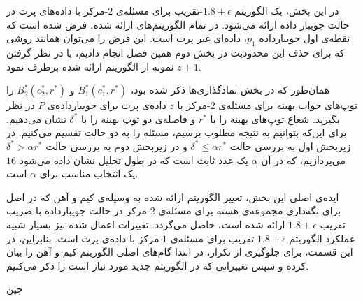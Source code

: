 
در این بخش، یک الگوریتم $1.8 + \epsilon$-تقریب برای مسئله‌ی $2$-مرکز با داده‌های پرت در حالت جویبار داده ارائه می‌شود. در تمام الگوریتم‌های ارائه شده، فرض شده است که نقطه‌ی اول جویبارداده $p_1$، داده‌ای غیر پرت است. این فرض را می‌توان همانند روشی که برای حذف این محدودیت در بخش دوم همین فصل انجام دادیم، با در نظر گرفتن $z+1$ نمونه از الگوریتم ارائه شده برطرف نمود.

همان‌طور که در بخش نماد‌گذاری‌ها ذکر شده بود، $B_1^*(c_1^*, r^*)$ و $B_2^*(c_2^*, r^*)$ را توپ‌های جواب بهینه برای مسئله‌ی $2$-مرکز با $z$ داده‌ی پرت برای جویبارداده‌ی $P$ در نظر بگیرید. شعاع توپ‌های بهینه را با $r^*$ و فاصله‌ی دو توپ بهینه را با $\delta^*$ نشان می‌دهیم. برای این‌که بتوانیم به نتیجه مطلوب برسیم، مسئله را به دو حالت تقسیم می‌کنیم. در زیربخش اول به بررسی حالت $\delta^* \leq \alpha r^*$ و در زیربخش دوم به بررسی حالت $\delta^* > \alpha r^*$ می‌پردازیم، که در آن $\alpha$ یک عدد ثابت است که در طول تحلیل نشان داده می‌شود $16$ یک انتخاب مناسب برای $\alpha$ است.



ایده‌ی اصلی این بخش، تغییر الگوریتم ارائه شده به وسیله‌ی کیم و آهن  که در اصل برای نگه‌داری مجموعه‌ی هسته برای مسئله‌ی $2$-مرکز در حالت جویبارداده با ضریب تقریب $1.8 + \epsilon$ ارائه شده است، حاصل می‌گردد. تغییرات اعمال شده نیز‌ بسیار شبیه عملکرد الگوریتم $1.8 + \epsilon$-تقریب برای مسئله‌ی $1$-مرکز با داده‌ی پرت است. بنابراین، در این قسمت، برای جلوگیری از تکرار، در ابتدا گام‌های اصلی الگوریتم کیم و آهن را بیان کرده و سپس تغییراتی که در الگوریتم جدید مورد نیاز است را ذکر می‌کنیم.

‌چین

